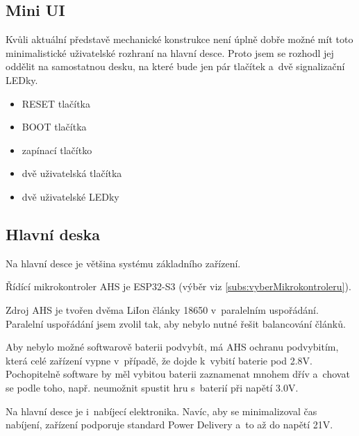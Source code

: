 \subsection{Mini UI}
Kvůli aktuální představě mechanické konstrukce není úplně dobře možné mít toto minimalistické uživatelské rozhraní na hlavní desce.
Proto jsem se rozhodl jej oddělit na samostatnou desku, na které bude jen pár tlačítek a~dvě signalizační LEDky.

\begin{itemize}
    \item RESET tlačítka
    \item BOOT tlačítka
    \item zapínací tlačítko
    \item dvě uživatelská tlačítka 
    \item dvě uživatelské LEDky
\end{itemize}

\subsection{Hlavní deska}
Na hlavní desce je většina systému základního zařízení.

Řídící mikrokontroler AHS je ESP32-S3 (výběr viz \ref{subs:vyberMikrokontroleru}).

Zdroj AHS je tvořen dvěma LiIon články 18650 v~paralelním uspořádání.
Paralelní uspořádání jsem zvolil tak, aby nebylo nutné řešit balancování článků.

Aby nebylo možné softwarově baterii podvybít, má AHS ochranu podvybitím, která celé zařízení vypne v~případě, že dojde k~vybití baterie pod 2.8V.
Pochopitelně software by měl vybitou baterii zaznamenat mnohem dřív a~chovat se podle toho, např. neumožnit spustit hru s~baterií při napětí 3.0V.

Na hlavní desce je i~nabíjecí elektronika.
Navíc, aby se minimalizoval čas nabíjení, zařízení podporuje standard Power Delivery a~to až do napětí 21V.

